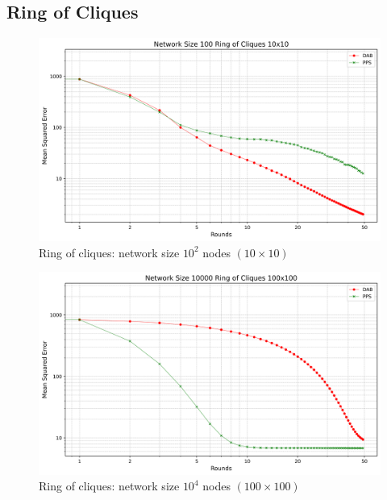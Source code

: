 \subsection{Ring of Cliques}
\begin{figure}[H]
    \centering
    \includegraphics[scale=0.5]{figures/ringOfCliquesSimulations/DAB_vs_PPS_RoC_r50_n100.png}
    \caption{Ring of cliques: network size $10^{2}$ nodes $(10 \times 10)$}
    \label{fig:10x10RingOfCliques}
\end{figure}
\begin{figure}[H]
    \centering
    \includegraphics[scale=0.5]{figures/ringOfCliquesSimulations/100x100/DAB_vs_PPS_RoC_r50_n10000.png}
    \caption{Ring of cliques: network size $10^{4}$ nodes $(100 \times 100)$}
    \label{fig:100x100RingOfCliques}
\end{figure}
